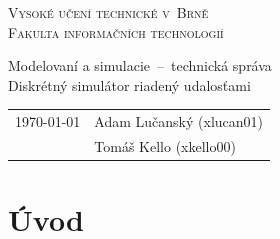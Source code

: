 \documentclass[11pt, a4paper, titlepage]{article}
\begin{document}
\begin{titlepage}

\begin{center}
{\Huge\textsc{Vysoké učení technické v~Brně}}\\
\medskip
{\huge\textsc{Fakulta informačních technologií}}\\

\LARGE{Modelovaní a simulacie\, -- \,technická správa} \\
\Huge{Diskrétný simulátor riadený udalos\v{t}ami} %

\end{center}

{\Large
\begin{tabularx}{\textwidth}{Xl}
  \today & Adam Lučanský (xlucan01) \\
         & Tomáš Kello (xkello00) \\
\end{tabularx}
}

\end{titlepage}
\newpage

\section{Úvod}
\end{document}
